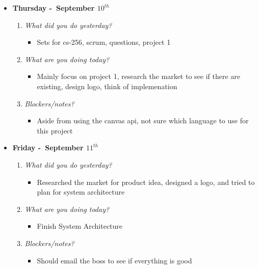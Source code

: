 \textbf{}
\begin{itemize}
  \item[] \textbf{\large Thursday -\ September \(10^{th}\)}
  \begin{enumerate}
    \item \textsl{What did you do yesterday?}
    \begin{itemize}
      \item Sets for cs-256, scrum, questions, project 1
    \end{itemize}
    \item \textsl{What are you doing today?}
    \begin{itemize}
      \item Mainly focus on project 1, research the market to see if there are existing, design logo, think of implemenation
    \end{itemize}
    \item \textsl{Blockers/notes?}
    \begin{itemize}
      \item Aside from using the canvas api, not sure which language to use for this project
    \end{itemize}
  \end{enumerate}
\end{itemize}
\textbf{}
\begin{itemize}
  \item[] \textbf{\large Friday -\ September \(11^{th}\)}
  \begin{enumerate}
    \item \textsl{What did you do yesterday?}
    \begin{itemize}
      \item Researched the market for product idea, designed a logo, and tried to plan for system architecture
    \end{itemize}
    \item \textsl{What are you doing today?}
    \begin{itemize}
      \item Finish System Architecture
    \end{itemize}
    \item \textsl{Blockers/notes?}
    \begin{itemize}
      \item Should email the boss to see if everything is good
    \end{itemize}
  \end{enumerate}
\end{itemize}